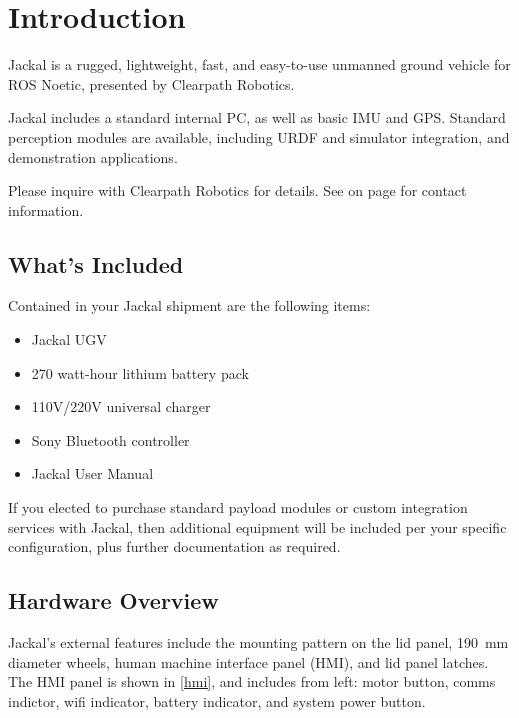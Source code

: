 \documentclass[]{clearpath-latex/clearpath-manual}
\begin{document}
\tableofcontents

\section{Introduction}

Jackal is a rugged, lightweight, fast, and easy-to-use unmanned ground vehicle for ROS
Noetic, presented by Clearpath Robotics.

Jackal includes a standard internal PC, as well as basic IMU and GPS. Standard
perception modules are available, including URDF and simulator integration, and
demonstration applications.

Please inquire with Clearpath Robotics for details. See  on page
\pageref{contact} for contact information.

\subsection{What's Included}

Contained in your Jackal shipment are the following items:

\begin{itemize}[nolistsep]
  \item Jackal UGV
  \item 270 watt-hour lithium battery pack
  \item 110V/220V universal charger
  \item Sony Bluetooth controller
  \item Jackal User Manual
\end{itemize}

If you elected to purchase standard payload modules or custom integration services with
Jackal, then additional equipment will be included per your specific configuration, plus
further documentation as required.

\subsection{Hardware Overview}

Jackal's external features include the mounting pattern on the lid panel, \SI{190}{\mm} diameter
wheels, human machine interface panel (HMI), and lid panel latches. The HMI panel is shown in
\autoref{hmi}, and includes from left: motor button, comms indictor, wifi indicator, battery
indicator, and system power button.

\end{document}
